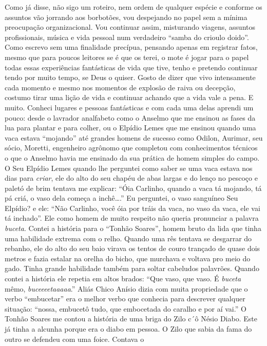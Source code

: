 \documentclass[12pt,brazil,]{book}
\begin{document}
Como já disse, não sigo um roteiro, nem ordem de qualquer espécie e
conforme os assuntos vão jorrando aos borbotões, vou despejando no papel
sem a mínima preocupação organizacional. Vou continuar assim, misturando
viagens, assuntos profissionais, música e vida pessoal num verdadeiro
``samba do crioulo doido''. Como escrevo sem uma finalidade precípua,
pensando apenas em registrar fatos, mesmo que para poucos leitores se é
que os terei, o mote é jogar para o papel todas essas experiências
fantásticas de vida que tive, tenho e pretendo continuar tendo por muito
tempo, se Deus o quiser. Gosto de dizer que vivo intensamente cada
momento e mesmo nos momentos de explosão de raiva ou decepção, costumo
tirar uma lição de vida e continuar achando que a vida vale a pena. E
muito. Conheci lugares e pessoas fantásticas e com cada uma delas
aprendi um pouco: desde o lavrador analfabeto como o Anselmo que me
ensinou as fases da lua para plantar e para colher, ou o Elpídio Lemes
que me ensinou quando uma vaca estava ``mojando'' até grandes homens de
sucesso como Odilon, Aurimar, seu sócio, Moretti, engenheiro agrônomo
que completou com conhecimentos técnicos o que o Anselmo havia me
ensinado da sua prática de homem simples do campo. O Seu Elpídio Lemes
quando lhe perguntei como saber se uma vaca estava nos dias para
\emph{criar}, ele do alto do seu chapéu de abas largas e do lenço no
pescoço e paletó de brim tentava me explicar: ``Óia Carlinho, quando a
vaca tá mojando, tá pá criá, o vaso dela começa a inchê\ldots{}.'' Eu
perguntei, o vaso sanguíneo Seu Elpídio? e ele: ``Não Carlinho, você óia
por tráis da vaca, no vaso da vaca, ele vai tá inchado''. Ele como homem
de muito respeito não queria pronunciar a palavra \emph{buceta}. Contei
a história para o ``Tonhão Soares'', homem bruto da lida que tinha uma
habilidade extrema com o relho. Quando uma rês tentava se desgarrar do
rebanho, ele do alto do seu baio virava os tentos de couro trançado de
quase dois metros e fazia estalar na orelha do bicho, que murchava e
voltava pro meio do gado. Tinha grande habilidade também para soltar
cabeludos palavrões. Quando contei a história ele repetia em altos
brados: ``Que vaso, que vaso. É \emph{buceta} mêmo,
\emph{buceeeetaaaaa}.'' Aliás Chico Anísio dizia com muita propriedade
que o verbo ``embucetar'' era o melhor verbo que conhecia para descrever
qualquer situação: ``nossa, embucetô tudo, que embocetada do caralho e
por aí vai.'' O Tonhão Soares me contou a história de uma briga do Zilo
c´ô Nésio Diabo. Este já tinha a alcunha porque era o diabo em pessoa. O
Zilo que sabia da fama do outro se defendeu com uma foice. Contava o
\end{document}
